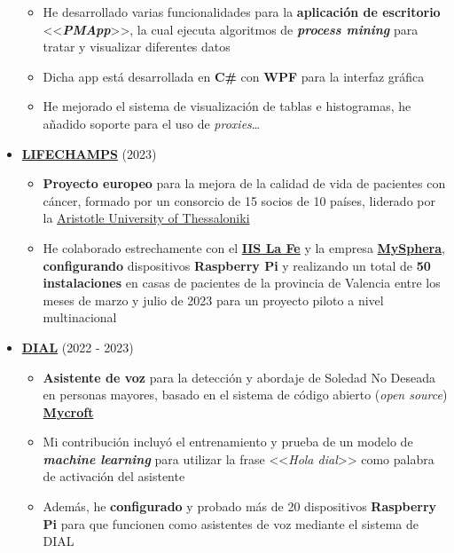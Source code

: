 \documentclass[letterpaper, 12pt, dvipsnames]{article}
\begin{document}
\begin{itemize}
\begin{itemize}
              \item He desarrollado varias funcionalidades para la \textbf{aplicación de escritorio} <<\textbf{\emph{PMApp}}>>, la cual ejecuta algoritmos de \textbf{\emph{process mining}} para tratar y visualizar diferentes datos
              \item Dicha app está desarrollada en \textbf{C\#} con \textbf{WPF} para la interfaz gráfica
              \item He mejorado el sistema de visualización de tablas e histogramas, he añadido soporte para el uso de \emph{proxies}\dots
          \end{itemize}
    \item {\large\textbf{\href{https://lifechamps.eu/}{LIFECHAMPS}}} (2023)
        \begin{itemize}
            \item \textbf{Proyecto europeo} para la mejora de la calidad de vida de pacientes con cáncer, formado por un consorcio de 15 socios de 10 países, liderado por la \href{https://www.auth.gr/en/}{Aristotle University of Thessaloniki}
            \item He colaborado estrechamente con el \textbf{\href{https://www.iislafe.es/es/}{IIS La Fe}} y la empresa \textbf{\href{https://www.mysphera.com/es/}{MySphera}}, \textbf{configurando} dispositivos \textbf{Raspberry Pi} y realizando un total de \textbf{50 instalaciones} en casas de pacientes de la provincia de Valencia entre los meses de marzo y julio de 2023 para un proyecto piloto a nivel multinacional
        \end{itemize}
    \item {\large\textbf{\href{http://www.sabien.upv.es/project/dial/}{DIAL}}} (2022 - 2023)
          \begin{itemize}
              \item \textbf{Asistente de voz} para la detección y abordaje de Soledad No Deseada en personas mayores, basado en el sistema de código abierto (\emph{open source}) \textbf{\href{https://mycroft.ai/}{Mycroft}}
              \item Mi contribución incluyó el entrenamiento y prueba de un modelo de \textbf{\emph{machine learning}} para utilizar la frase <<\emph{Hola dial}>> como palabra de activación del asistente
              \item Además, he \textbf{configurado} y probado más de 20 dispositivos \textbf{Raspberry Pi} para que funcionen como asistentes de voz mediante el sistema de DIAL
          \end{itemize}

\end{itemize}
\end{document}
